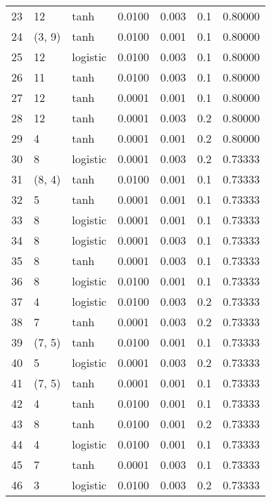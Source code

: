 \begin{tabular}{lllrrrr}
23  &          12 &      tanh &  0.0100 &  0.003 &  0.1 &   0.80000 \\
24  &      (3, 9) &      tanh &  0.0100 &  0.001 &  0.1 &   0.80000 \\
25  &          12 &  logistic &  0.0100 &  0.003 &  0.1 &   0.80000 \\
26  &          11 &      tanh &  0.0100 &  0.003 &  0.1 &   0.80000 \\
27  &          12 &      tanh &  0.0001 &  0.001 &  0.1 &   0.80000 \\
28  &          12 &      tanh &  0.0001 &  0.003 &  0.2 &   0.80000 \\
29  &           4 &      tanh &  0.0001 &  0.001 &  0.2 &   0.80000 \\
30  &           8 &  logistic &  0.0001 &  0.003 &  0.2 &   0.73333 \\
31  &      (8, 4) &      tanh &  0.0100 &  0.001 &  0.1 &   0.73333 \\
32  &           5 &      tanh &  0.0001 &  0.001 &  0.1 &   0.73333 \\
33  &           8 &  logistic &  0.0001 &  0.001 &  0.1 &   0.73333 \\
34  &           8 &  logistic &  0.0001 &  0.003 &  0.1 &   0.73333 \\
35  &           8 &      tanh &  0.0001 &  0.003 &  0.1 &   0.73333 \\
36  &           8 &  logistic &  0.0100 &  0.001 &  0.1 &   0.73333 \\
37  &           4 &  logistic &  0.0100 &  0.003 &  0.2 &   0.73333 \\
38  &           7 &      tanh &  0.0001 &  0.003 &  0.2 &   0.73333 \\
39  &      (7, 5) &      tanh &  0.0100 &  0.001 &  0.1 &   0.73333 \\
40  &           5 &  logistic &  0.0001 &  0.003 &  0.2 &   0.73333 \\
41  &      (7, 5) &      tanh &  0.0001 &  0.001 &  0.1 &   0.73333 \\
42  &           4 &      tanh &  0.0100 &  0.001 &  0.1 &   0.73333 \\
43  &           8 &      tanh &  0.0100 &  0.001 &  0.2 &   0.73333 \\
44  &           4 &  logistic &  0.0100 &  0.001 &  0.1 &   0.73333 \\
45  &           7 &      tanh &  0.0001 &  0.003 &  0.1 &   0.73333 \\
46  &           3 &  logistic &  0.0100 &  0.003 &  0.2 &   0.73333 \\

\end{tabular}

